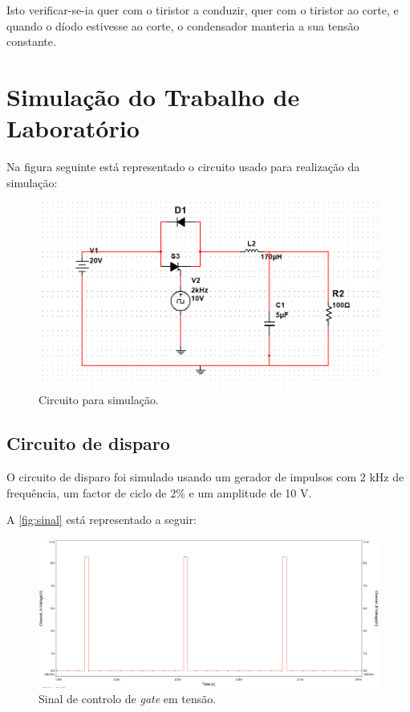 \documentclass[a4paper,11pt]{article}
\numberwithin{equation}{section}
\begin{document}
Isto verificar-se-ia quer com o tiristor a conduzir, quer com o tiristor ao corte, e quando o díodo estivesse ao corte, o condensador manteria a sua tensão constante.

\pagebreak

\section{Simulação do Trabalho de Laboratório}
Na figura seguinte está representado o circuito usado para realização da simulação:


\begin{figure}[h]
	\centering
	\includegraphics[keepaspectratio=true, scale=0.565]{img/sim/circuit}
	\caption{Circuito para simulação.}
	\label{fig:circ}
	\vspace{-0.8em}
\end{figure}

\subsection{Circuito de disparo}

O circuito de disparo foi simulado usando um gerador de impulsos com 2 kHz de frequência, um factor de ciclo de 2\% e um amplitude de 10 V.

A \autoref{fig:sinal} está representado a seguir:

\begin{figure}[h]
	\centering
	\includegraphics[keepaspectratio=true, scale=0.365]{img/sim/sinalentrada}
	\caption{Sinal de controlo de \textit{gate} em tensão.}
	\label{fig:sinal}
	\vspace{-0.8em}
	\end{figure}
	
\end{document}
